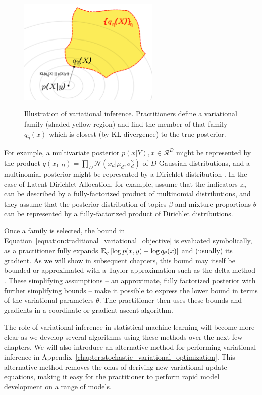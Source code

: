 \begin{figure}
  \center
  \includegraphics[width=0.6\textwidth]{chapter_introductory_material/figs/variational_family.pdf}
  \label{fig:variational_inference}
  \caption{Illustration of variational inference.  Practitioners
    define a variational family (shaded yellow region) and find the
    member of that family $q_{\hat \eta}(x)$ which is closest (by KL
    divergence) to the true posterior.}
\end{figure}
For example, a multivariate posterior $p(x | Y), x \in \mathcal{R}^D$
might be represented by the product $q(x_{1:D}) = \prod_D
\mathcal{N}(x_d | \mu_d, \sigma_d^2)$ of $D$ Gaussian distributions,
and a multinomial posterior might be represented by a Dirichlet
distribution \citep{bishop:2006}.  In the case of Latent Dirichlet
Allocation, for example, \cite{blei:2003} assume that the indicators
$z_n$ can be described by a fully-factorized product of multinomial
distributions, and they assume that the posterior distribution of
topics $\beta$ and mixture proportions $\theta$ can be represented by
a fully-factorized product of Dirichlet distributions.

Once a family is selected, the bound in
Equation~\ref{equation:traditional_variational_objective} is evaluated
symbolically, as a practitioner fully expands $\mathbb{E}_q\left[ \log p(x, y)
  - \log q_\theta(x)\right]$ and (usually) its gradient. As we will show in
subsequent chapters, this bound may itself be bounded or approximated
with a Taylor approximation such as the delta method
\citep{bickel:2007,braun:2007}. These simplifying assumptions -- an
approximate, fully factorized posterior with further simplifying
bounds -- make it possible to express the lower bound in terms of the
variational parameters $\theta$.  The practitioner then uses these
bounds and gradients in a coordinate or
gradient ascent algorithm.

The role of variational inference in statistical machine learning will
become more clear as we develop several algorithms using these methods
over the next few chapters.  We will also introduce an alternative
method for performing variational inference in
Appendix~\ref{chapter:stochastic_variational_optimization}.  This
alternative method removes the onus of deriving new variational update
equations, making it easy for the practitioner to perform rapid model
development on a range of models.

